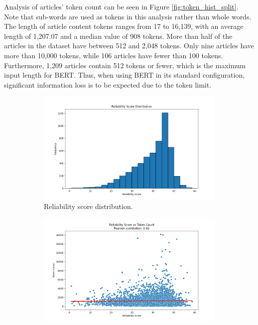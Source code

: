 Analysis of articles' token count can be seen in Figure \ref{fig:token_hist_split}. Note that sub-words are used as tokens in this analysis rather than whole words. The length of article content tokens ranges from 17 to 16,139, with an average length of 1,207.07 and a median value of 908 tokens. More than half of the articles in the dataset have between 512 and 2,048 tokens. Only nine articles have more than 10,000 tokens, while 106 articles have fewer than 100 tokens. Furthermore, 1,209 articles contain 512 tokens or fewer, which is the maximum input length for BERT. Thus, when using BERT in its standard configuration, significant information loss is to be expected due to the token limit.

\begin{figure}[htbp]
    \centering
    \begin{subfigure}{0.49\linewidth}
        \includegraphics[width=1\linewidth]{figures/reliability_score_hist.png}
        \caption{Reliability score distribution.}
        \label{fig:reliability_score_hist}
    \end{subfigure}
    \begin{subfigure}{0.49\linewidth}
        \includegraphics[width=1\linewidth]{figures/correlation_token_reliability_score.png}

\end{subfigure}
\end{figure}
